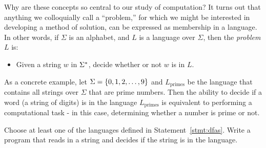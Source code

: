 
\begin{discussion}
Why are these concepts so central to our study of computation? It turns out that anything we colloquially call a ``problem,'' for which we might be interested in developing a method of solution, can be expressed as membership in a language. In other words, if $\Sigma$ is an alphabet, and $L$ is a language over $\Sigma$, then the \emph{problem} $L$ is:
\begin{itemize}
\item Given a string $w$ in $\Sigma^{*}$, decide whether or not $w$ is in $L$.
\end{itemize}
As a concrete example, let $\Sigma = \left\lbrace 0, 1, 2, \ldots, 9 \right\rbrace$ and $L_\textrm{primes}$ be the language that contains all strings over $\Sigma$ that are prime numbers. Then the ability to decide if a word (a string of digits) is in the language $L_\textrm{primes}$ is equivalent to performing a computational task - in this case, determining whether a number is prime or not.



\end{discussion}

\begin{progexer}\happymac
Choose at least one of the languages defined in Statement~\ref{stmt:dfas}. Write a program that reads in a string and decides if the string is in the language. 
\end{progexer}

